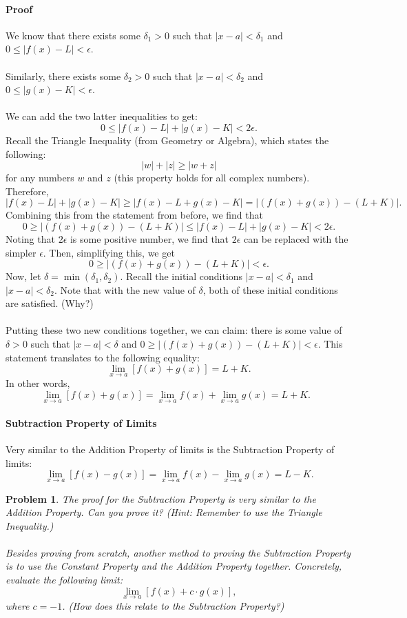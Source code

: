 \documentclass{article}
\newtheorem*{problem}{Problem}
\begin{document}
\paragraph{Proof} We know that there exists some $\delta_1>0$ such that $\left|x-a\right|<\delta_1$ and $0\leq\left|f(x)-L\right|<\epsilon$.
\\
\\
Similarly, there exists some $\delta_2>0$ such that $\left|x-a\right|<\delta_2$ and $0\leq\left|g(x)-K\right|<\epsilon$.
\\
\\
We can add the two latter inequalities to get:
\[0\leq \left|f(x)-L\right| + \left|g(x)-K\right| < 2\epsilon.\]
Recall the Triangle Inequality (from Geometry or Algebra), which states the following:
\[|w|+|z|\geq |w+z|\]
for any numbers $w$ and $z$ (this property holds for all complex numbers). Therefore, 
\[\left|f(x)-L\right| + \left|g(x)-K\right| \geq \left|f(x)-L + g(x)-K\right|=\left|(f(x) + g(x))-(L+K)\right|.\]
Combining this from the statement from before, we find that 
\[0\geq \left|(f(x) + g(x))-(L+K)\right|\leq \left|f(x)-L\right| + \left|g(x)-K\right| < 2\epsilon.\]
Noting that $2\epsilon$ is some positive number, we find that $2\epsilon$ can be replaced with the simpler $\epsilon$. Then, simplifying this, we get
\[0\geq \left|(f(x) + g(x))-(L+K)\right| < \epsilon.\]
Now, let $\delta=\min(\delta_1,\delta_2)$. Recall the initial conditions $|x-a|<\delta_1$ and $|x-a|<\delta_2$. Note that with the new value of $\delta$, both of these initial conditions are satisfied. (Why?)
\\
\\
Putting these two new conditions together, we can claim: there is some value of $\delta >0$ such that $|x-a|<\delta$ and $0\geq \left|(f(x) + g(x))-(L+K)\right| < \epsilon$. This statement translates to the following equality: 
\[\lim_{x\to a} [f(x)+g(x)]=L+K.\]
In other words, 
\[\lim_{x\to a}[f(x)+g(x)]=\lim_{x\to a}f(x) + \lim_{x\to a}g(x)=L+K.\text{ }\boxed{}\]

\paragraph{Subtraction Property of Limits} Very similar to the Addition Property of limits is the Subtraction Property of limits:
\[\lim_{x\to a}[f(x)-g(x)]=\lim_{x\to a}f(x) - \lim_{x\to a}g(x)=L-K.\]
\begin{problem}
The proof for the Subtraction Property is very similar to the Addition Property. Can you prove it? (Hint: Remember to use the Triangle Inequality.) 
\\
\\
Besides proving from scratch, another method to proving the Subtraction Property is to use the Constant Property and the Addition Property together. Concretely, evaluate the following limit:
\[\lim_{x\to a}[f(x)+c\cdot g(x)],\]
where $c=-1$. (How does this relate to the Subtraction Property?)
\end{problem}
\end{document}
